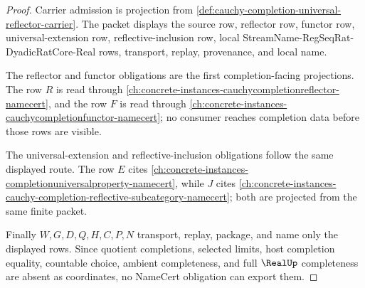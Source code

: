 \begin{proof}
Carrier admission is projection from \autoref{def:cauchy-completion-universal-reflector-carrier}. The packet displays the source row, reflector row, functor row, universal-extension row, reflective-inclusion row, local StreamName-RegSeqRat-DyadicRatCore-Real rows, transport, replay, provenance, and local name.

The reflector and functor obligations are the first completion-facing projections. The row $R$ is read through \autoref{ch:concrete-instances-cauchycompletionreflector-namecert}, and the row $F$ is read through \autoref{ch:concrete-instances-cauchycompletionfunctor-namecert}; no consumer reaches completion data before those rows are visible.

The universal-extension and reflective-inclusion obligations follow the same displayed route. The row $E$ cites \autoref{ch:concrete-instances-completionuniversalproperty-namecert}, while $J$ cites \autoref{ch:concrete-instances-cauchy-completion-reflective-subcategory-namecert}; both are projected from the same finite packet.

Finally $W,G,D,Q,H,C,P,N$ transport, replay, package, and name only the displayed rows. Since quotient completions, selected limits, host completion equality, countable choice, ambient completeness, and full $\RealUp$ completeness are absent as coordinates, no NameCert obligation can export them.
\end{proof}

